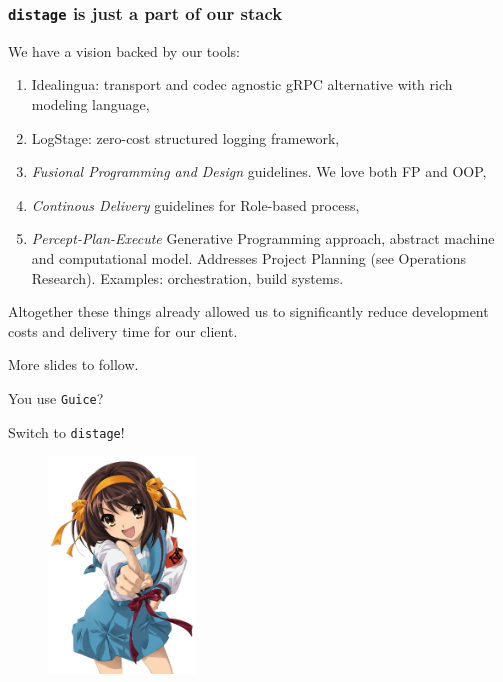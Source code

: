 \documentclass[usenames,dvipsnames]{beamer}
\newcommand{\distage}{\texttt{distage}\xspace}
\begin{document}
\begin{frame}
  \frametitle{\distage is just a part of our stack}
  We have a vision backed by our tools:
  \begin{enumerate}
    \item Idealingua: transport and codec agnostic gRPC alternative with rich modeling language,
    \item LogStage: zero-cost structured logging framework,
    \item \textit{Fusional Programming and Design} guidelines. We love both FP and OOP,
    \item \textit{Continous Delivery} guidelines for Role-based process,
    \item \textit{Percept-Plan-Execute} Generative Programming approach, abstract machine and computational model.
    Addresses Project Planning (see Operations Research). Examples: orchestration, build systems.
  \end{enumerate}

  Altogether these things already allowed us to significantly reduce development costs and
  delivery time for our client.\newline

  More slides to follow.
\end{frame}

\begin{frame}
  \begin{center}
  \Huge
  You use \texttt{Guice}?

  Switch to \distage!

  \begin{figure}
      \includegraphics[width=0.35\textwidth]{media/haruhi.jpg}
  \end{figure}

  \end{center}
\end{frame}
\end{document}
